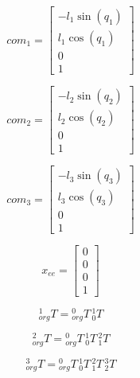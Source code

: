 \documentclass{article}
\begin{document}
\begin{equation}
	com_1 = \begin{bmatrix}
 	{-l_{1} \sin{(q_{1} )}}\\
 	l_{1} \cos{(q_{1} )}\\
 	0\\
 	1
\end{bmatrix}
\end{equation}

\begin{equation}
	com_2 = \begin{bmatrix}
 	-l_{2} \sin{(q_{2} )}\\
 	l_{2} \cos{(q_{2} )}\\
 	0\\
 	1
\end{bmatrix}
\end{equation}

\begin{equation}
	com_3 = \begin{bmatrix}
  	-l_{3} \sin{(q_{3} )}\\
  	l_{3} \cos{(q_{3} )}\\
  	0\\
  	1
\end{bmatrix}
\end{equation}

\begin{equation}
	x_{ee} = \begin{bmatrix}
 	0\\
 	0\\
 	0\\
 	1
\end{bmatrix}
\end{equation}

\begin{equation}
	{}_{org}^1 T = {}_{org}^0 T \, {}_0^1 T
\end{equation}

\begin{equation}
	{}_{org}^2 T = {}_{org}^0 T \, {}_0^1 T \, {}_1^2 T
\end{equation}

\begin{equation}
	{}_{org}^3 T = {}_{org}^0 T \, {}_0^1 T \, {}_1^2 T \, {}_2^3 T
\end{equation}
\end{document}
